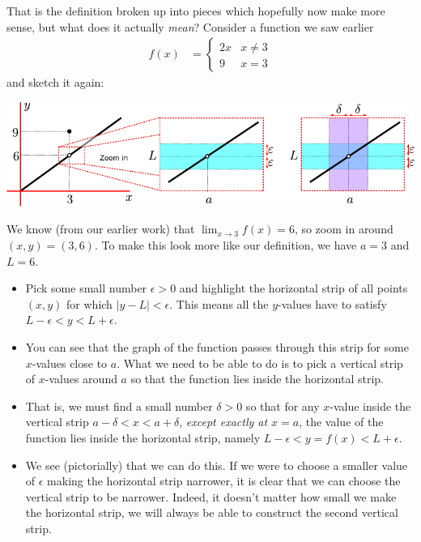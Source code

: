 That is the definition broken up into pieces which hopefully now make more
sense, but what does it actually \emph{mean}? Consider a function we saw earlier
\begin{align*}
 f(x) &= \begin{cases}
          2x & x\neq3 \\
          9 & x=3
         \end{cases}
\end{align*}
and sketch it again:
\begin{fig}
\begin{center}
 \includegraphics[width=\textwidth]{epsdelt1}
\end{center}
\end{fig}
We know (from our earlier work) that $\lim_{x \to 3} f(x) = 6$, so zoom in
around $(x,y)=(3,6)$. To make this look more like our definition, we have $a=3$
and $L=6$.
\begin{itemize}
 \item Pick some small number $\epsilon>0$ and highlight the horizontal strip
of all points $(x,y)$ for which $|y-L|<\epsilon$. This means all the
$y$-values have to satisfy $L-\epsilon < y < L+\epsilon$.

\item You can see that the graph of the function passes through this strip for
some $x$-values close to $a$. What we need to be able to do is to pick a
vertical strip of $x$-values around $a$ so that the function lies inside the
horizontal strip.

\item That is, we must find a small number $\delta>0$ so that for any $x$-value
inside the vertical strip $a-\delta < x < a+\delta$, \emph{except exactly at
$x=a$}, the value of the function lies inside the horizontal strip, namely
$L-\epsilon < y=f(x) < L+\epsilon$.

\item We see (pictorially) that we can do this. If we were to choose a
smaller value of $\epsilon$ making the horizontal strip narrower, it is clear
that we can choose the vertical strip to be narrower. Indeed, it
doesn't matter how small we make the horizontal strip, we will always be able
to construct the second vertical strip.
\end{itemize}

